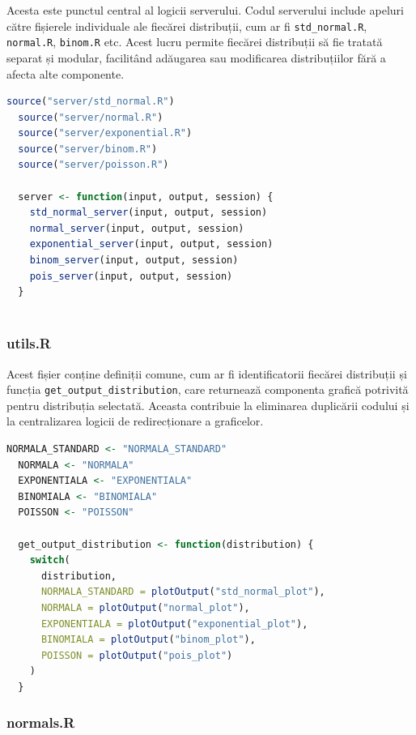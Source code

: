 \documentclass[a4paper,11pt]{article}
\begin{document}
Acesta este punctul central al logicii serverului. Codul serverului include apeluri către fișierele individuale ale fiecărei distribuții, cum ar fi \texttt{std\_normal.R}, \texttt{normal.R}, \texttt{binom.R} etc. Acest lucru permite fiecărei distribuții să fie tratată separat și modular, facilitând adăugarea sau modificarea distribuțiilor fără a afecta alte componente.

\begin{lstlisting}[language=R]
  source("server/std_normal.R")
  source("server/normal.R")
  source("server/exponential.R")
  source("server/binom.R")
  source("server/poisson.R")
  
  server <- function(input, output, session) {
    std_normal_server(input, output, session)
    normal_server(input, output, session)
    exponential_server(input, output, session)
    binom_server(input, output, session)
    pois_server(input, output, session)
  }
  
\end{lstlisting}

\subsubsection*{utils.R}

Acest fișier conține definiții comune, cum ar fi identificatorii fiecărei distribuții și funcția \texttt{get\_output\_distribution}, care returnează componenta grafică potrivită pentru distribuția selectată. Aceasta contribuie la eliminarea duplicării codului și la centralizarea logicii de redirecționare a graficelor.

\begin{lstlisting}[language=R]
  NORMALA_STANDARD <- "NORMALA_STANDARD"
  NORMALA <- "NORMALA"
  EXPONENTIALA <- "EXPONENTIALA"
  BINOMIALA <- "BINOMIALA"
  POISSON <- "POISSON"
  
  get_output_distribution <- function(distribution) {
    switch(
      distribution,
      NORMALA_STANDARD = plotOutput("std_normal_plot"),
      NORMALA = plotOutput("normal_plot"),
      EXPONENTIALA = plotOutput("exponential_plot"),
      BINOMIALA = plotOutput("binom_plot"),
      POISSON = plotOutput("pois_plot")
    )
  }
\end{lstlisting}

\subsubsection*{normals.R}
\end{document}
